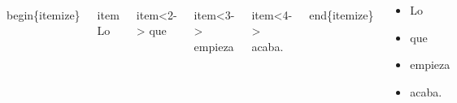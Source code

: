 \documentclass[11pt]{beamer}
\begin{document}
\begin{frame}

\begin{block}{}

\begin{columns}
\begin{semiverbatim}\scriptsize
\\begin\{itemize\}
\end{semiverbatim}

\begin{semiverbatim}\scriptsize
 \\item Lo
\end{semiverbatim}

\begin{semiverbatim}\scriptsize
 \\item<2-> que
\end{semiverbatim}

\begin{semiverbatim}\scriptsize
 \\item<3-> empieza
\end{semiverbatim}

\begin{semiverbatim}\scriptsize
 \\item<4-> acaba.
\end{semiverbatim}

\begin{semiverbatim}\scriptsize
\\end\{itemize\}
\end{semiverbatim}



\begin{itemize}
\pause \item Lo  \pause \item que \pause \item empieza \pause
\item acaba.
\end{itemize}


\end{columns}
\end{block}






\end{frame}
\end{document}
